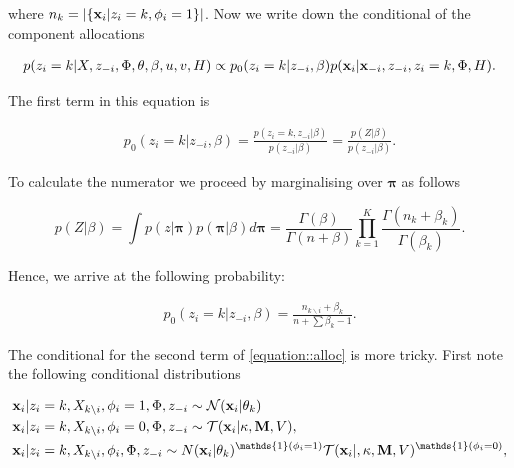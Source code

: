 \documentclass[12pt,english]{article}\usepackage[]{graphicx}\usepackage[]{color}
\begin{document}
where $n_k = \lvert\{{\bf x}_i|z_i=k, \phi_i = 1\}\rvert$.
Now we write down the conditional of the component allocations

\begin{equation} \label{equation::alloc}
\begin{split}
p(z_i = k|X,z_{-i},\Phi, \theta, \beta, u,v, H) \propto p_0(z_i = k|z_{-i},\beta)p({\bf x}_i|{\bf x}_{-i},z_{-i}, z_i = k,\Phi, H).
\end{split}
\end{equation}

The first term in this equation is

\begin{equation}
\begin{split}
 p_0(z_i = k|z_{-i},\beta) = \frac{p(z_i = k, z_{-i}|\beta)}{p(z_{-i}|\beta)} = \frac{p(Z|\beta)}{p(z_{-i}|\beta)}.
\end{split}
\end{equation}

To calculate the numerator we proceed by marginalising over $\boldsymbol{\pi}$ as follows

\begin{equation}
p(Z|\beta) = \int p(z|\boldsymbol{\pi})p(\boldsymbol{\pi}|\beta) d\boldsymbol{\pi} = \frac{\Gamma(\beta)}{\Gamma(n + \beta)}\prod_{k=1}^{K}\frac{\Gamma(n_k + \beta_k)}{\Gamma(\beta_k)}.
\end{equation}

Hence, we arrive at the following probability:

\begin{equation}
\begin{split}
p_0(z_i = k|z_{-i},\beta) = \frac{n_{k \backslash i} + \beta_k}{n + \sum \beta_k - 1}.
\end{split}
\end{equation}

The conditional for the second term of \ref{equation::alloc} is more tricky. First note the following conditional distributions

\begin{equation}
\begin{split}
{\bf x}_i |& z_i = k, X_{k\backslash i}, \phi_i = 1, \Phi, z_{-i} \sim \mathcal{N}({\bf x}_i|\theta_{k})\\
{\bf x}_i |& z_i = k, X_{k\backslash i}, \phi_i = 0, \Phi, z_{-i} \sim \mathcal{T}({\bf x}_i|\kappa, {\bf M},V), \\
{\bf x}_i |& z_i = k, X_{k\backslash i}, \phi_i, \Phi, z_{-i}\sim N({\bf x}_i|\theta_{k})^{\mathds{1}(\phi_i=1)}\mathcal{T}({\bf x}_i|,\kappa,{\bf M},V)^{\mathds{1}(\phi_i=0)}, \\
\end{split}
\end{equation}
\end{document}
